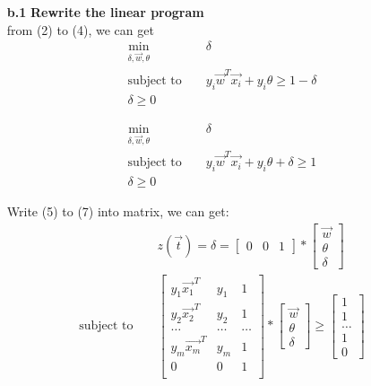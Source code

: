 \begin{enumerate}
\begin{enumerate}
\begin{enumerate}
\item[{\bf b.1 }] {\bf Rewrite the linear program}\\

from (2) to (4), we can get 
\begin{eqnarray}
    \min_{\delta, \vec{w}, \theta} & & \delta \\
    \textrm{subject to } & & y_i \vec{w}^T \vec{x_i} + y_i \theta \geq 1 - \delta \\
    \delta \geq 0
\end{eqnarray}

\begin{eqnarray}
    \min_{\delta, \vec{w}, \theta} & & \delta \\
    \textrm{subject to } & & y_i \vec{w}^T \vec{x_i} + y_i \theta  + \delta \geq 1 \\
    \delta \geq 0
\end{eqnarray}

Write (5) to (7) into matrix, we can get:\\
\begin{eqnarray}
    & & z(\vec{t}) = \delta = \begin{bmatrix}
     0 & 0 & 1 
     \end{bmatrix} * \begin{bmatrix}
    \vec{w} \\ \theta \\ \delta 
    \end{bmatrix}\\    
    \textrm{subject to } & & \begin{bmatrix}
    y_1\vec{x_1}^T & y_1 & 1 \\
    y_2\vec{x_2}^T & y_2 & 1 \\
    \ldots & \ldots & \ldots \\
    y_m\vec{x_m}^T & y_m & 1 \\
    0 & 0 & 1 \\    
    \end{bmatrix} * \begin{bmatrix}
    \vec{w} \\ \theta \\ \delta
    \end{bmatrix} \geq \begin{bmatrix}
    1 \\ 1 \\ \ldots \\ 1 \\ 0
    \end{bmatrix}
\end{eqnarray}\\


\end{enumerate}
\end{enumerate}
\end{enumerate}
